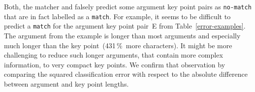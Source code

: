Both, the \BertBase matcher and \RobertaBase falsely predict some argument key point pairs as \texttt{no-match} that are in 
fact labelled as a \texttt{match}.
For example, it seems to be difficult to predict a \texttt{match} for the argument key point pair~E from Table~\ref{error-examples}.
The argument from the example is longer than most arguments and especially much longer than the key point~(431\,\%~more characters).
It might be more challenging to reduce such longer arguments, that contain more complex information, to very compact key points.
We confirm that observation by comparing the squared classification error with respect to the absolute difference between 
argument and key point lengths.
